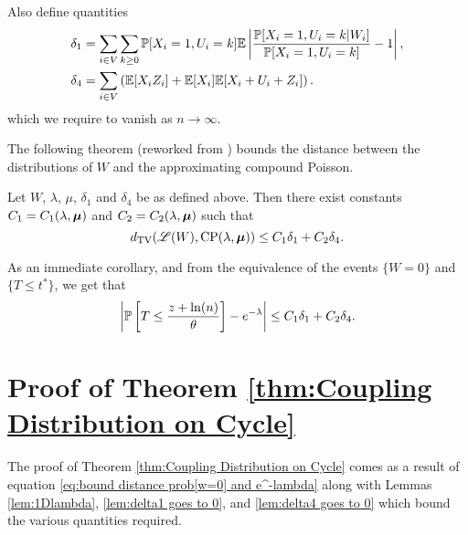 	Also define quantities
	\begin{align}
		\delta_1 &= \sum_{i \in V}  \sum_{k \geq 0} \mathbb{P}[X_i = 1, U_i = k] \mathbb{E} \left|\frac{\mathbb{P}[X_i = 1, U_i = k|W_i]}{\mathbb{P}[X_i = 1, U_i = k]} - 1 \right|,\\ 
		\delta_4 &= \sum_{i \in V} \left( \mathbb{E}[X_i Z_i] + \mathbb{E}[X_i] \mathbb{E}[X_i + U_i + Z_i] \right).
	\end{align}
	which we require to vanish as $n \rightarrow \infty$.

	The following theorem (reworked from \cite{Barbour2001-nh}) bounds the distance between the distributions of $W$ and the approximating compound Poisson.

	\begin{theorem}
	\label{thm: compound poisson approximation}
		Let $W$, $\lambda$, $\mu$, $\delta_1$ and $\delta_4$ be as defined above. Then there exist constants $C_1 = C_1(\lambda, {\bm{{\mu}}})$ and $C_2 = C_2(\lambda, {\bm{{\mu}}})$ such that
		\begin{equation}
			d_{\mathrm{TV}}(\mathscr{L}(W), \mathrm{CP}(\lambda, {\bm{{\mu}}})) \leq C_1 \delta_1 + C_2 \delta_4.
		\end{equation}
	\end{theorem}
	As an immediate corollary, and from the equivalence of the events $\{W = 0\}$ and $\{T \leq t^*\}$, we get that
	\begin{equation}
		\left|\mathbb{P}\left[T \leq \frac{z+\ln(n)}{\theta}\right] - e^{-\lambda}\right| \leq C_1 \delta_1 + C_2 \delta_4.
		\label{eq:bound distance prob[w=0] and e^-lambda}
	\end{equation}

	\section{Proof of Theorem \ref{thm:Coupling Distribution on Cycle}}
	\label{sec:proof thm coupling cycle}
	The proof of Theorem \ref{thm:Coupling Distribution on Cycle} comes as a result of equation \eqref{eq:bound distance prob[w=0] and e^-lambda} along with Lemmas \ref{lem:1Dlambda}, \ref{lem:delta1 goes to 0}, and \ref{lem:delta4 goes to 0} which bound the various quantities required.



